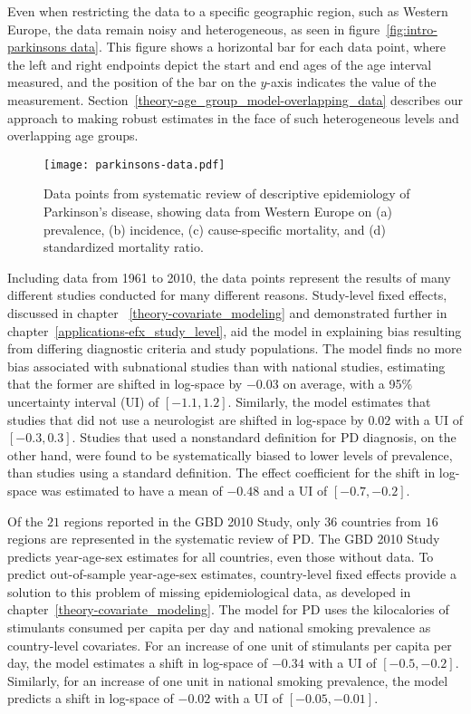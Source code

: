 Even when restricting the data to a
specific geographic region, such as Western Europe, the data remain
noisy and heterogeneous, as seen in figure~\ref{fig:intro-parkinsons
  data}. This figure shows a horizontal bar for each data point, where
the left and right endpoints depict the start and end ages of the age
interval measured, and the position of the bar on the $y$-axis indicates the value of the
measurement. Section~\ref{theory-age_group_model-overlapping_data}
describes our approach to making
robust estimates in the face of such heterogeneous levels and
overlapping age groups.

    \begin{figure}[h]
        \begin{center}
            \texttt{[image: parkinsons-data.pdf]}
            \caption{Data points from systematic review of descriptive
              epidemiology of Parkinson's disease, showing data from
              Western Europe on (a) prevalence, (b) incidence, (c)
              cause-specific mortality, and (d) standardized mortality
              ratio.}
            \label{fig:intro-parkinsons data}
        \end{center}
    \end{figure}

Including data from 1961 to 2010, the data points represent the results
of many different studies conducted for many different reasons.
Study-level fixed effects, discussed in chapter
~\ref{theory-covariate_modeling} and demonstrated further in
chapter~\ref{applications-efx_study_level}, aid the model in
explaining bias resulting from differing diagnostic criteria and study
populations.  The model finds no more bias associated with subnational
studies than with national studies, estimating that the former are
shifted in log-space by $-0.03$ on average, with a 95\% uncertainty
interval (UI) of $[-1.1, 1.2]$.  Similarly, the model estimates that studies that did not use a
neurologist are shifted in log-space by $0.02$ with a
UI of $[-0.3, 0.3]$.  Studies that used a nonstandard definition for PD
diagnosis, on the other hand, were found to be systematically biased
to lower levels of prevalence, than studies using a standard definition. The
effect coefficient for the shift in log-space was estimated to have a
mean of $-0.48$ and a UI of $[-0.7, -0.2]$.

Of the $21$ regions reported in the GBD 2010 Study, only $36$ countries
from $16$ regions are represented in the systematic review of PD.  The GBD
2010 Study predicts year-age-sex estimates for all countries, even
those without data.  To predict out-of-sample year-age-sex estimates, country-level fixed
effects provide a solution to this problem of missing epidemiological data,
as developed in chapter~\ref{theory-covariate_modeling}.  The model for PD uses the
kilocalories of stimulants consumed per capita per day and national smoking prevalence
as country-level covariates.  For an increase of one unit of stimulants per
capita per day, the model estimates a shift in log-space of $-0.34$
with a UI of $[-0.5, -0.2]$.  Similarly, for an increase of one unit in national
smoking prevalence, the model predicts a shift in log-space of $-0.02$ with a UI
of $[-0.05, -0.01]$.

